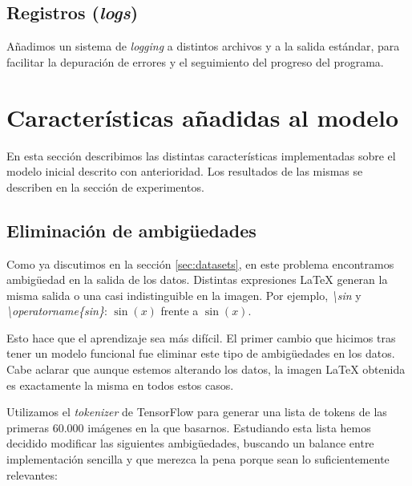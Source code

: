 \documentclass[a4paper, 20pt, dvipsnames]{article}
\begin{document}
\subsection{Registros (\emph{logs})}

Añadimos un sistema de \emph{logging} a distintos archivos y a la salida
estándar, para facilitar la depuración de errores y el seguimiento del progreso
del programa.


\section{Características añadidas al modelo}

En esta sección describimos las distintas características implementadas sobre el
modelo inicial descrito con anterioridad. Los resultados de las mismas se
describen en la sección de experimentos.


\subsection{Eliminación de ambigüedades}
\label{feature:rem-amb}

Como ya discutimos en la sección \ref{sec:datasets}, en este problema
encontramos ambigüedad en la salida de los datos. Distintas expresiones \LaTeX{}
generan la misma salida o una casi indistinguible en la imagen. Por ejemplo,
\emph{\textbackslash sin} y \emph{\textbackslash operatorname\{sin\}}: $\sin(x)$
frente a $\operatorname{sin}(x)$.

Esto hace que el aprendizaje sea más difícil. El primer cambio que hicimos tras
tener un modelo funcional fue eliminar este tipo de ambigüedades en los
datos. Cabe aclarar que aunque estemos alterando los datos, la imagen \LaTeX{}
obtenida es exactamente la misma en todos estos casos.

Utilizamos el \emph{tokenizer} de TensorFlow \cite{tokenizer} para generar una
lista de tokens de las primeras 60.000 imágenes en la que basarnos. Estudiando
esta lista hemos decidido modificar las siguientes ambigüedades, buscando un
balance entre implementación sencilla y que merezca la pena porque sean lo
suficientemente relevantes:
\end{document}
